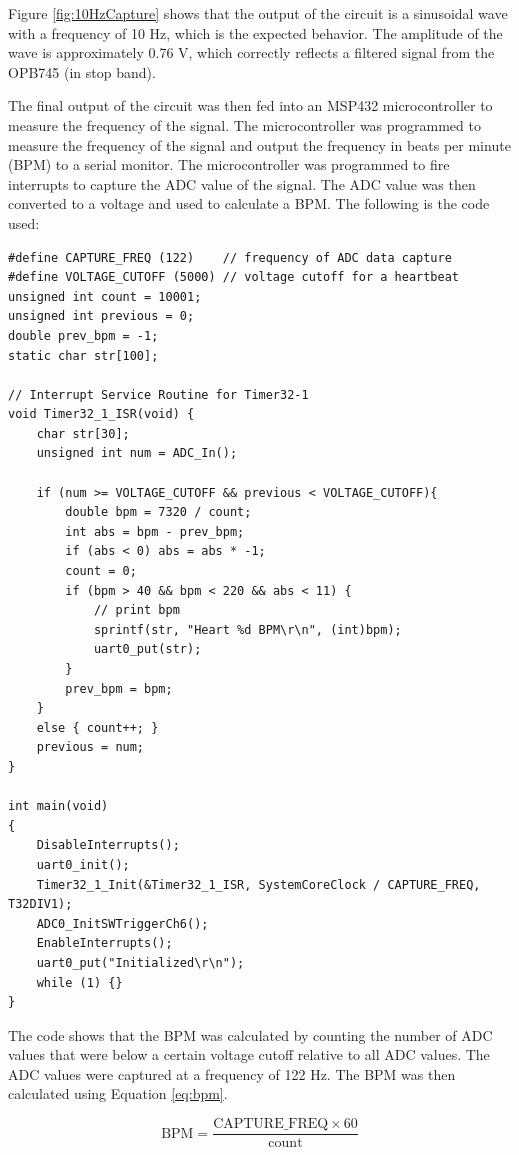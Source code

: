 \documentclass[CMPE]{KGCOEReport}
\begin{document}
Figure \ref{fig:10HzCapture} shows that the output of the circuit is a sinusoidal wave with a frequency of 10 Hz, which is the expected behavior. The amplitude of the wave is approximately 0.76 V, which correctly reflects a filtered signal from the OPB745 (in stop band).

\bigskip

The final output of the circuit was then fed into an MSP432 microcontroller to measure the frequency of the signal. The microcontroller was programmed to measure the frequency of the signal and output the frequency in beats per minute (BPM) to a serial monitor. The microcontroller was programmed to fire interrupts to capture the ADC value of the signal. The ADC value was then converted to a voltage and used to calculate a BPM. The following is the code used:

\begin{verbatim}
#define CAPTURE_FREQ (122)    // frequency of ADC data capture
#define VOLTAGE_CUTOFF (5000) // voltage cutoff for a heartbeat
unsigned int count = 10001;
unsigned int previous = 0;
double prev_bpm = -1;
static char str[100];

// Interrupt Service Routine for Timer32-1
void Timer32_1_ISR(void) {
    char str[30];
    unsigned int num = ADC_In();

    if (num >= VOLTAGE_CUTOFF && previous < VOLTAGE_CUTOFF){
        double bpm = 7320 / count;
        int abs = bpm - prev_bpm;
        if (abs < 0) abs = abs * -1;
        count = 0;
        if (bpm > 40 && bpm < 220 && abs < 11) {
            // print bpm
            sprintf(str, "Heart %d BPM\r\n", (int)bpm);
            uart0_put(str);
        }
        prev_bpm = bpm;
    }
    else { count++; }
    previous = num;
}

int main(void)
{
    DisableInterrupts();
    uart0_init();
    Timer32_1_Init(&Timer32_1_ISR, SystemCoreClock / CAPTURE_FREQ, T32DIV1);
    ADC0_InitSWTriggerCh6();
    EnableInterrupts();
    uart0_put("Initialized\r\n");
    while (1) {}
}
\end{verbatim}

The code shows that the BPM was calculated by counting the number of ADC values that were below a certain voltage cutoff relative to all ADC values. The ADC values were captured at a frequency of 122 Hz. The BPM was then calculated using Equation \ref{eq:bpm}.

\begin{equation}
\text{BPM} = \frac{\text{CAPTURE\_FREQ} \times 60}{\text{count}} \label{eq:bpm}
\end{equation}
\end{document}
